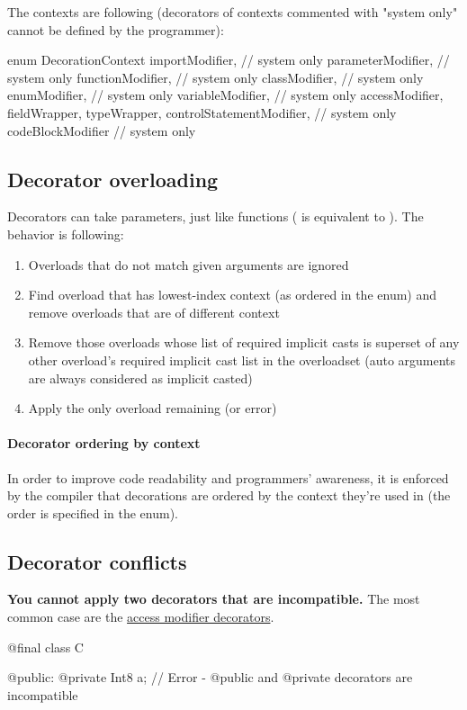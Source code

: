 The contexts are following (decorators of contexts commented with "system only" cannot be defined by the programmer):
\begin{code}
enum DecorationContext {
	importModifier, // system only
	parameterModifier, // system only
	functionModifier, // system only
	classModifier, // system only
	enumModifier, // system only
	variableModifier, // system only
	accessModifier,
	fieldWrapper,
	typeWrapper,
	controlStatementModifier, // system only
	codeBlockModifier // system only
}
\end{code} \label{enum:DecorationContext}

\subsection{Decorator overloading}
Decorators can take parameters, just like functions ( is equivalent to ). The behavior is following:
\begin{enumerate}
	\item Overloads that do not match given arguments are ignored
	\item Find overload that has lowest-index context (as ordered in the  enum) and remove overloads that are of different context
	\item Remove those overloads whose list of required implicit casts is superset of any other overload's required implicit cast list in the overloadset (auto arguments are always considered as implicit casted)
	\item Apply the only overload remaining (or error)
\end{enumerate}

\paragraph{Decorator ordering by context} In order to improve code readability and programmers' awareness, it is enforced by the compiler that decorations are ordered by the context they're used in (the order is specified in the  enum).

\subsection{Decorator conflicts}
\textbf{You cannot apply two decorators that are incompatible.} The most common case are the \hyperref[accessModifierDecorators]{access modifier decorators}.
\begin{code}
@final class C {

@public:
	@private Int8 a; // Error - @public and @private decorators are incompatible
	
}
\end{code}

